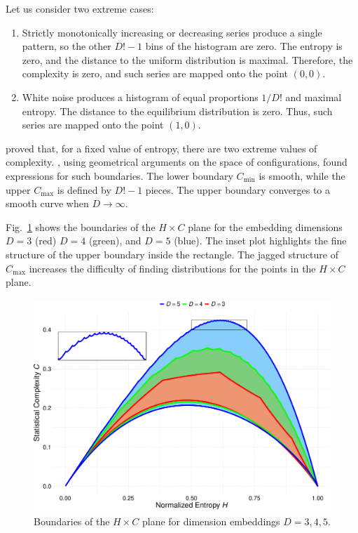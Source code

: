 Let us consider two extreme cases:
\begin{enumerate}[label=Case~\Roman*., align=left, leftmargin=*]
	\item 	Strictly monotonically increasing or decreasing series produce a single pattern, so the other $D!-1$ bins of the histogram are zero. 
	The entropy is zero, and the distance to the uniform distribution is maximal. 
	Therefore, the complexity is zero, and such series are mapped onto the point $(0,0)$.
	\item 	White noise produces a histogram of equal proportions $1/D!$ and maximal entropy. 
	The distance to the equilibrium distribution is zero. 
	Thus, such series are mapped onto the point $(1,0)$.
\end{enumerate}

\citet{SomeFeaturesoftheLMCStatisticalComplexity} proved that, for a fixed value of entropy, there are two extreme values of complexity.
\citet{martin2006generalized}, using geometrical arguments on the space of configurations, found expressions for such boundaries.
The lower boundary $C_{\min}$ is smooth, while the upper $C_{\max}$ is defined by $D!-1$ pieces.
The upper boundary converges to a smooth curve when $D\to\infty$.


Fig.~\ref{fig:Boundaries} shows the boundaries of the $H\times C$ plane for the embedding dimensions $D=3$ (red) $D=4$ (green), and $D=5$ (blue).
The inset plot highlights the fine structure of the upper boundary inside the rectangle.
The jagged structure of $C_{\max}$ increases the difficulty of finding distributions for the points in the $H\times C$ plane.

\begin{figure}[hbt]
	\centering
	\includegraphics[width=.7\linewidth]{Figures/BoundariesPlot}
	\caption{Boundaries of the $H\times C$ plane for dimension embeddings $D=3,4,5$.}\label{fig:Boundaries}
\end{figure}

